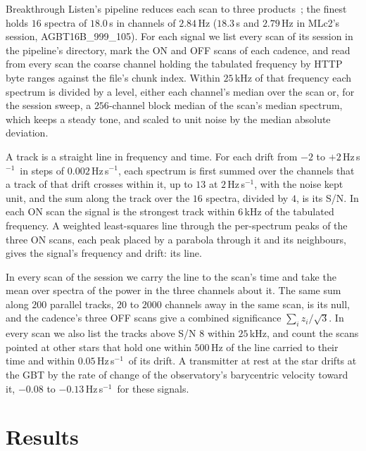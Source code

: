 \documentclass[3p,11pt]{elsarticle}
\newcommand{\hzs}{Hz\,s$^{-1}$}
\begin{document}
Breakthrough Listen's pipeline reduces each scan to three products~\cite{MacMahon2018,Lebofsky2019}; the finest holds
$16$ spectra of $18.0$\,s in channels of $2.84$\,Hz ($18.3$\,s and $2.79$\,Hz in MLc2's session, AGBT16B\_999\_105).
For each signal we list every scan of its session in the pipeline's directory, mark the ON and OFF scans of each
cadence, and read from every scan the coarse channel holding the tabulated frequency by HTTP byte ranges against the
file's chunk index. Within $25$\,kHz of that frequency each spectrum is divided by a level, either each channel's
median over the scan or, for the session sweep, a $256$-channel block median of the scan's median spectrum, which keeps
a steady tone, and scaled to unit noise by the median absolute deviation.

A track is a straight line in frequency and time. For each drift from $-2$ to $+2$\,\hzs\ in steps of
$0.002$\,\hzs, each spectrum is first summed over the channels that a track of that drift crosses within it, up to
$13$ at $2$\,\hzs, with the noise kept unit, and the sum along the track over the $16$ spectra, divided by $4$, is its
S/N. In each ON scan the signal is the strongest track within $6$\,kHz of the tabulated frequency. A weighted
least-squares line through the per-spectrum peaks of the three ON scans, each peak placed by a parabola through it and
its neighbours, gives the signal's frequency and drift: its line.

In every scan of the session we carry the line to the scan's time and take the mean over spectra of the power in the
three channels about it. The same sum along $200$ parallel tracks, $20$ to $2000$ channels away in the same scan, is
its null, and the cadence's three OFF scans give a combined significance $\sum_i z_i/\sqrt{3}$. In every scan we also
list the tracks above S/N $8$ within $25$\,kHz, and count the scans pointed at other stars that hold one within
$500$\,Hz of the line carried to their time and within $0.05$\,\hzs\ of its drift. A transmitter at rest at the star
drifts at the GBT by the rate of change of the observatory's barycentric velocity toward it, $-0.08$ to $-0.13$\,\hzs\
for these signals.

\section{Results}\label{sec:results}
\end{document}
